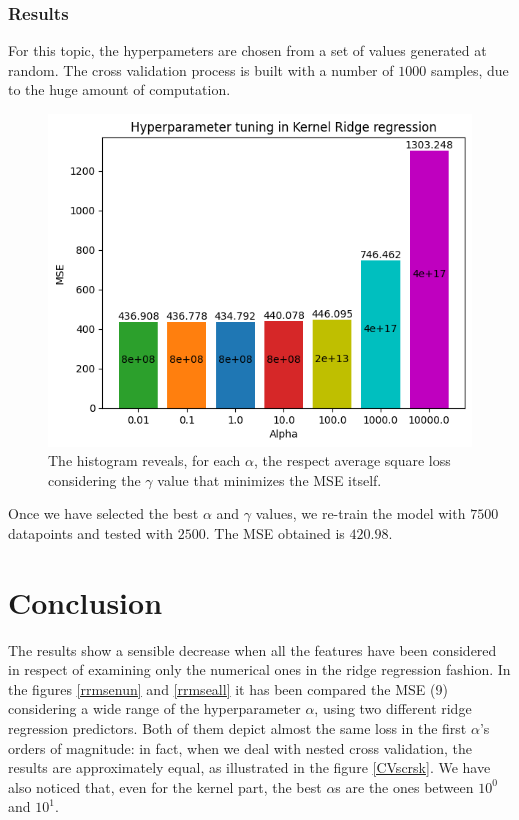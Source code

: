 \documentclass{article}
\begin{document}
\subsubsection{Results}
For this topic, the hyperpameters are chosen from a set of values generated at random. The cross validation process is built with a number of $1000$ samples, due to the huge amount of computation. 
\begin{figure}[H]
	\begin{adjustwidth}{0 cm}{}
		\begin{center}
			\includegraphics[scale= 0.7]{images/hyptuningKRR.png}
		\end{center}
	\end{adjustwidth}
	\caption{The histogram reveals, for each $\alpha$, the respect average square loss considering the $\gamma$ value that minimizes the MSE itself.}
	\label{hyptuningKRR}
\end{figure}
    
Once we have selected the best $\alpha$ and $\gamma$ values, we re-train the model with $7500$ datapoints and tested with $2500$. The MSE obtained is $420.98$. 

\section{Conclusion}
The results show a sensible decrease when all the features have been considered in respect of examining only the numerical ones in the ridge regression fashion. In the figures \ref{rrmsenun} and \ref{rrmseall} it has been compared the MSE (9) considering a wide range of the hyperparameter $\alpha$, using two different ridge regression predictors. Both of them depict almost the same loss in the first $\alpha$'s orders of magnitude: in fact, when we deal with nested cross validation, the results are approximately equal, as illustrated in the figure \ref{CVscrsk}. We have also noticed that, even for the kernel part, the best $\alpha$s are the ones between $10^0$ and $10^1$.   
\end{document}
